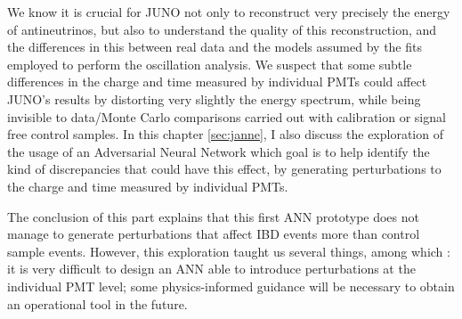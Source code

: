 \documentclass[../main.tex]{subfiles}
\begin{document}
We know it is crucial for JUNO not only to reconstruct very precisely the energy of antineutrinos, but also to understand the quality of this reconstruction, and the differences in this between real data and the models assumed by the fits employed to perform the oscillation analysis. We suspect that some subtle differences in the charge and time measured by individual PMTs could affect JUNO's results by distorting very slightly the energy spectrum, while being invisible to data/Monte Carlo comparisons carried out with calibration or signal free control samples. In this chapter \ref{sec:janne}, I also discuss the exploration of the usage of an Adversarial Neural Network which goal is to help identify the kind of discrepancies that could have this effect, by generating perturbations
to the charge and time measured by individual PMTs.

The conclusion of this part explains that this first ANN prototype does not manage to generate perturbations that affect IBD events more than control sample events.  However, this exploration taught us several things, among which : it is very difficult to design an ANN able to introduce perturbations at the individual PMT level; some physics-informed guidance will be necessary to obtain an operational tool in the future.

\hfill

%
%
%
\end{document}
